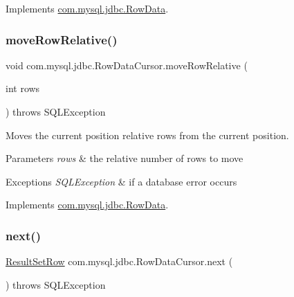 Implements \mbox{\hyperlink{interfacecom_1_1mysql_1_1jdbc_1_1_row_data_a372c70885e7272deb3ad84fefb75eebb}{com.\+mysql.\+jdbc.\+Row\+Data}}.

\mbox{\label{classcom_1_1mysql_1_1jdbc_1_1_row_data_cursor_a48c5fb5e19b57e073818cc524d913155}} 
\subsubsection{\texorpdfstring{move\+Row\+Relative()}{moveRowRelative()}}
{\footnotesize\ttfamily void com.\+mysql.\+jdbc.\+Row\+Data\+Cursor.\+move\+Row\+Relative (\begin{DoxyParamCaption}\item[{int}]{rows }\end{DoxyParamCaption}) throws S\+Q\+L\+Exception}

Moves the current position relative \textquotesingle{}rows\textquotesingle{} from the current position.


\begin{DoxyParams}{Parameters}
{\em rows} & the relative number of rows to move \\
\hline
\end{DoxyParams}

\begin{DoxyExceptions}{Exceptions}
{\em S\+Q\+L\+Exception} & if a database error occurs \\
\hline
\end{DoxyExceptions}


Implements \mbox{\hyperlink{interfacecom_1_1mysql_1_1jdbc_1_1_row_data_ad0ef1f79fa19fbd533c4e1bfbabd7316}{com.\+mysql.\+jdbc.\+Row\+Data}}.

\mbox{\label{classcom_1_1mysql_1_1jdbc_1_1_row_data_cursor_a10e57b268e86eaa793ecf951ee83a863}} 
\subsubsection{\texorpdfstring{next()}{next()}}
{\footnotesize\ttfamily \mbox{\hyperlink{classcom_1_1mysql_1_1jdbc_1_1_result_set_row}{Result\+Set\+Row}} com.\+mysql.\+jdbc.\+Row\+Data\+Cursor.\+next (\begin{DoxyParamCaption}{ }\end{DoxyParamCaption}) throws S\+Q\+L\+Exception}

